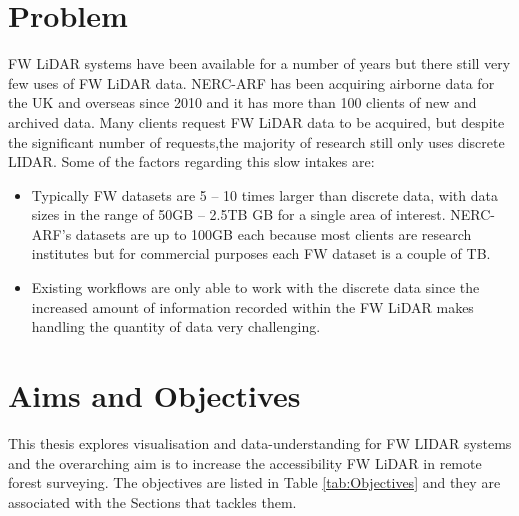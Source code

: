 \documentclass{subfiles}
\begin{document}
\section{Problem}\label{sec:Problem}
\par FW LiDAR systems have been available for a number of years but there still very few uses of FW LiDAR data. NERC-ARF has been acquiring airborne data for the UK and overseas since 2010 and it has more than 100 clients of new and archived data. Many clients request FW LiDAR data to be acquired, but despite the significant number of requests,the majority of research still only uses discrete LIDAR. Some of the factors regarding this slow intakes are:
\begin{itemize}
	\item Typically FW datasets are 5 – 10 times larger than discrete data, with data sizes in the range of 50GB – 2.5TB GB for a single area of interest. NERC-ARF's datasets are up to 100GB each because most clients are research institutes but for commercial purposes each FW dataset is a couple of TB.
	\item Existing workflows are only able to work with the discrete data since the increased amount of information recorded within the FW LiDAR makes handling the quantity of data very challenging.
\end{itemize}

\section {Aims and Objectives}\label{sec:AimsObjectives}

\par This thesis explores visualisation and data-understanding for FW LIDAR systems and the overarching aim is to increase the accessibility FW LiDAR in remote forest surveying. {\color{blue}The objectives are listed in Table \ref{tab:Objectives} and they are associated with the Sections that tackles them.}
\end{document}
